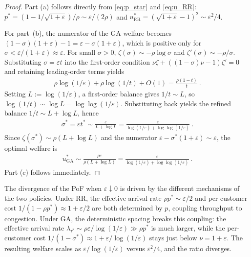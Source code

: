 \documentclass[11pt]{article}
\begin{document}
\begin{proof}
Part (a) follows directly from \eqref{eq:p_star} and \eqref{eq:u_RR}: $p^*=(1-1/\sqrt{1+\varepsilon})/\rho\sim \varepsilon/(2\rho)$ and $u^*_{\mathrm{RR}}=(\sqrt{1+\varepsilon}-1)^2\sim\varepsilon^2/4$.
 
For part~(b), the numerator of the GA welfare becomes $(1-\sigma)(1+\varepsilon)-1=\varepsilon-\sigma(1+\varepsilon)$, which is positive only for $\sigma<\varepsilon/(1+\varepsilon)\approx\varepsilon$.  For small $\sigma>0$, $\zeta(\sigma)\sim -\rho\log\sigma$ and $\zeta'(\sigma)\sim -\rho/\sigma$.
Substituting $\sigma=\varepsilon t$ into the first-order condition $\nu\zeta+((1-\sigma)\nu-1)\zeta'=0$ and retaining leading-order terms yields
\begin{align*}
\rho\log(1/\varepsilon)+\rho\log(1/t)+O(1)=\frac{\rho(1-t)}{t}\ .
\end{align*}
Setting $L:=\log(1/\varepsilon)$, a first-order balance gives $1/t\sim L$, so $\log(1/t)\sim\log L=\log\log(1/\varepsilon)$. Substituting back yields the refined balance $1/t\sim L+\log L$, hence
\begin{align*}
\sigma^*=\varepsilon t^*\sim \frac{\varepsilon}{L+\log L}=\frac{\varepsilon}{\log(1/\varepsilon)+\log\log(1/\varepsilon)}\ .
\end{align*}
Since $\zeta(\sigma^*)\sim\rho(L+\log L)$ and the numerator $\varepsilon-\sigma^*(1+\varepsilon)\sim\varepsilon$, the optimal welfare is
\begin{align*}
u^*_{\mathrm{GA}}\sim\frac{\rho\varepsilon}{\rho(L+\log L)}=\frac{\varepsilon}{\log(1/\varepsilon)+\log\log(1/\varepsilon)}\ .
\end{align*}
Part (c) follows immediately.
\end{proof}

The divergence of the PoF when $\varepsilon\downarrow 0$ is driven by the different mechanisms of the two policies.  Under RR, the effective arrival rate $\rho p^*\sim\varepsilon/2$ and per-customer cost $1/(1-\rho p^*)\approx 1+\varepsilon/2$ are both determined by $p$, coupling throughput to congestion.  Under GA, the deterministic spacing breaks this coupling: the effective arrival rate $\lambda_{\tau^*}\sim\rho\varepsilon/\!\log(1/\varepsilon)\gg\rho p^*$ is much larger, while the per-customer cost $1/(1-\sigma^*)\approx 1+\varepsilon/\!\log(1/\varepsilon)$ stays just below $\nu=1+\varepsilon$.  The resulting welfare scales as $\varepsilon/\!\log(1/\varepsilon)$ versus $\varepsilon^2/4$, and the ratio diverges.
\end{document}
